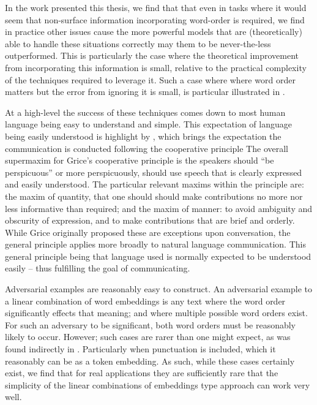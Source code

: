 \documentclass{book}
\begin{document}
In the work presented this thesis, 
we find that that even in tasks where it would seem that non-surface information incorporating word-order is required,
we find in practice other issues cause the more powerful models that are (theoretically) able to handle these situations correctly may them to be never-the-less outperformed.
This is particularly the case where the theoretical improvement from incorporating this information is small, relative to the practical complexity of the techniques required to leverage it.
Such a case where where word order matters but the error from ignoring it is small, is particular illustrated in .

At a high-level the success of these techniques comes down to most human language being easy to understand and simple.
This expectation of language being easily understood is highlight by \citep{grice1975logic}, which brings the expectation the communication is conducted following the cooperative principle
The overall supermaxim for Grice's cooperative principle is the speakers should ``be perspicuous'' or more perspicuously, should use speech that is clearly expressed and easily understood.
The particular relevant maxims within the principle are:
the maxim of quantity, that one should should make contributions no more nor less informative than required;
and the maxim of manner: to avoid ambiguity and obscurity of expression, and to make contributions that are brief and orderly.
While Grice originally proposed these are exceptions upon conversation, the general principle applies more broadly to natural language communication.
This general principle being that language used is normally expected to be understood easily -- thus fulfilling the goal of communicating.


Adversarial examples are reasonably easy to construct.
An adversarial example to a linear combination of word embeddings is any text where the word order significantly effects that meaning;
and where multiple possible word orders exist.
For such an adversary to be significant, both word orders must be reasonably likely to occur.
However; such cases are rarer than one might expect, as was found indirectly in .
Particularly when punctuation is included, which it reasonably can be as a token embedding.
As such, while these cases certainly exist, we find that for real applications
they are sufficiently rare that the simplicity of the linear combinations of embeddings type approach can work very well.
\end{document}
